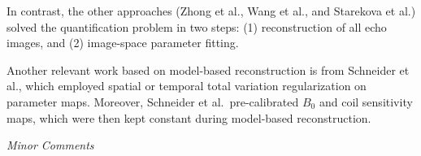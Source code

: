 \documentclass[a4paper,11pt]{report}
\begin{document}
\begin{enumerate}
\hspace{1em} In contrast, the other approaches (Zhong et al., Wang et al., and Starekova et al.) 
solved the quantification problem in two steps: 
(1) reconstruction of all echo images, and (2) image-space parameter fitting. 

\hspace{1em} Another relevant work based on model-based reconstruction is from Schneider et al., 
which employed spatial or temporal total variation regularization on parameter maps. 
Moreover, Schneider et al.~pre-calibrated $B_0$ and coil sensitivity maps, 
which were then kept constant during model-based reconstruction.

\end{enumerate}

\noindent \textit{Minor Comments}
\end{document}
